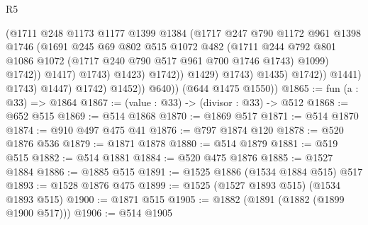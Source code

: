 \begin{lexlean}{R5}
\begin{coremodule}
                                        (@1711
                                          @248
                                          @1173
                                          @1177
                                          @1399
                                          @1384
                                          (@1717
                                            @247
                                            @790
                                            @1172
                                            @961
                                            @1398
                                            @1746
                                            (@1691
                                              @245
                                              @69
                                              @802
                                              @515
                                              @1072
                                              @482
                                              (@1711
                                                @244
                                                @792
                                                @801
                                                @1086
                                                @1072
                                                (@1717 @240 @790 @517 @961 @700 @1746 @1743)
                                                @1099)
                                              @1742))
                                          @1417)
                                        @1743)
                                      @1423)
                                    @1742))
                                @1429)
                              @1743)
                            @1435)
                          @1742))
                      @1441)
                    @1743)
                  @1447)
                @1742)
              @1452))
          @640))
      (@644 @1475 @1550))
@1865 := fun (a : @33) => @1864
@1867 := (value : @33) -> (divisor : @33) -> @512
@1868 := @652 @515
@1869 := @514 @1868
@1870 := @1869 @517
@1871 := @514 @1870
@1874 := @910 @497 @475 @41
@1876 := @797 @1874 @120
@1878 := @520 @1876 @536
@1879 := @1871 @1878
@1880 := @514 @1879
@1881 := @519 @515
@1882 := @514 @1881
@1884 := @520 @475 @1876
@1885 := @1527 @1884
@1886 := @1885 @515
@1891 := @1525 @1886 (@1534 @1884 @515) @517
@1893 := @1528 @1876 @475
@1899 := @1525 (@1527 @1893 @515) (@1534 @1893 @515)
@1900 := @1871 @515
@1905 := @1882 (@1891 (@1882 (@1899 @1900 @517)))
@1906 := @514 @1905

\end{coremodule}
\end{lexlean}
